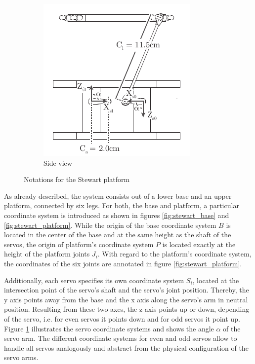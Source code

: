 \begin{figure}
	\begin{subfigure}{0.49\textwidth}
		\centering
		\includegraphics{../figures/stewart_side}
		\caption{Side view}
		\label{fig:stewart_side}
	\end{subfigure}
	\caption{Notations for the Stewart platform}
	\label{fig:stewart_notation}
\end{figure}

As already described, the system consists out of a lower base and an upper
platform, connected by six legs. For both, the base and platform, a particular
coordinate system is introduced as shown in figures \ref{fig:stewart_base} and
\ref{fig:stewart_platform}. While the origin of the base coordinate system $B$
is located in the center of the base and at the same height as the shaft of
the servos, the origin of platform's coordinate system $P$ is located exactly
at the height of the platform joints $J_i$. With regard to the platform's
coordinate system, the coordinates of the six joints are annotated in figure
\ref{fig:stewart_platform}.

Additionally, each servo specifies its own coordinate system $S_i$, located at
the intersection point of the servo's shaft and the servo's joint position.
Thereby, the y axis points away from the base and the x axis along the servo's
arm in neutral position. Resulting from these two axes, the z axis points up
or down, depending of the servo, i.e. for even servos it points down and for
odd servos it point up. Figure \ref{fig:stewart_side} illustrates the servo
coordinate systems and shows the angle $\alpha$ of the servo arm. The
different coordinate systems for even and odd servos allow to handle all
servos analogously and abstract from the physical configuration of the servo
arms.

